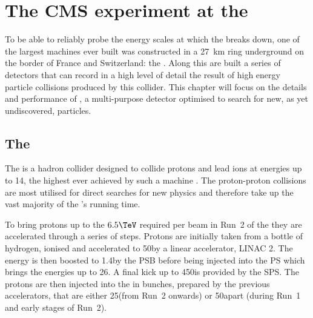 \chapter{The CMS experiment at the \LHC}
\label{chap:detector}


To be able to reliably probe the energy scales at which the \SM breaks
down, one of the largest machines ever built was constructed in a
27~km ring underground on the border of France and Switzerland: the
\LHC. Along this are built a series of detectors that can record in a high
level of detail the result of high energy particle collisions produced
by this collider. This chapter will focus on the details and
performance of \CMS, a multi-purpose detector optimised to search for
new, as yet undiscovered, particles.

\section{The \LHC}
\label{sec:lhc}

The \LHC is a hadron collider designed to collide protons and lead
ions at energies up to 14\tev, the highest ever achieved by such a
machine
\cite{Evans:2008zzb,CERN-2004-003-V-1,CERN-2004-003-V-2,CERN-2004-003-V-3}.
The proton-proton collisions are most utilised for direct searches for
new physics and therefore take up the vast majority of the \LHC's
running time. 

To bring protons up to the $6.5\tev$ required per beam in Run~2 of
the \LHC they are accelerated through a series of steps. Protons are
initially taken from a bottle of hydrogen, ionised and accelerated to
50\mev by a linear accelerator, \ac{LINAC 2}. The energy is then boosted to
1.4\gev by the \ac{PSB} before being injected into the \ac{PS} which
brings the energies up to 26\gev. A final kick up to 450\gev is
provided by the \ac{SPS}. The protons are then injected into the \LHC
in bunches, prepared by the previous accelerators, that are either
25\ns (from Run~2 onwards) or 50\ns apart (during Run~1 and early
stages of Run~2).

